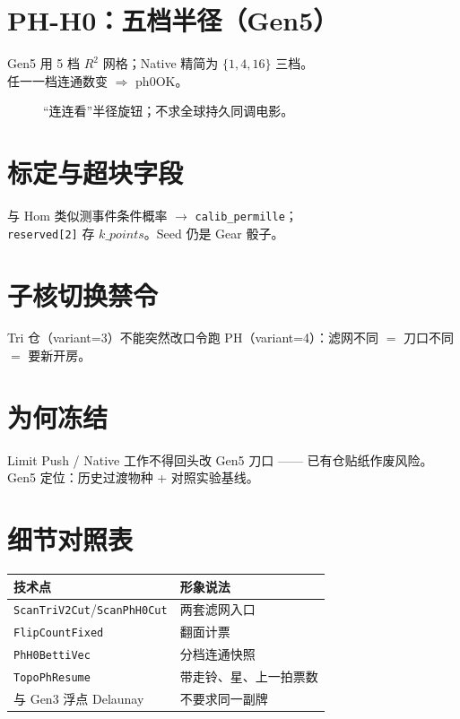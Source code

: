 \section{PH-H0：五档半径（Gen5）}

Gen5 用 5 档 $R^2$ 网格；Native 精简为 $\{1,4,16\}$ 三档。\\
任一一档连通数变 $\Rightarrow$ ph0OK。

\begin{figure}[htbp]
\centering
{}
\caption{``连连看''半径旋钮；不求全球持久同调电影。}
\label{fig:five-eps}
\end{figure}

\section{标定与超块字段}

与 Hom 类似测事件条件概率 $\to$ \texttt{calib\_permille}；\\
\texttt{reserved[2]} 存 $k\_points$。Seed 仍是 Gear 骰子。

\section{子核切换禁令}

Tri 仓（variant=3）不能突然改口令跑 PH（variant=4）：滤网不同 $=$ 刀口不同 $=$ 要新开房。

\section{为何冻结}

Limit Push / Native 工作不得回头改 Gen5 刀口 —— 已有仓贴纸作废风险。\\
Gen5 定位：历史过渡物种 + 对照实验基线。

\section{细节对照表}

\begin{center}
\small
\begin{tabular}{@{}lp{7cm}@{}}
\toprule
技术点 & 形象说法 \\
\midrule
\texttt{ScanTriV2Cut}/\texttt{ScanPhH0Cut} & 两套滤网入口 \\
\texttt{FlipCountFixed} & 翻面计票 \\
\texttt{PhH0BettiVec} & 分档连通快照 \\
\texttt{TopoPhResume} & 带走铃、星、上一拍票数 \\
与 Gen3 浮点 Delaunay & 不要求同一副牌 \\
\bottomrule
\end{tabular}
\end{center}
